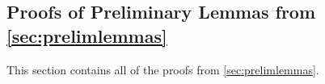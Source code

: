 \documentclass[10pt]{article}
\newcommand{\0}{{\mathbf{0}}}
\newcommand{\1}{{\mathbf{1}}}
\newcommand{\U}{{\mathbf{U}}}
\renewcommand{\t}{^{\top}}
\newcommand{\uhat}{\mathbf{\hat{U}}}
\newtheorem{corollary}{Corollary}
\newcommand{\inv}{^{-1}}
\renewcommand{\hat}{\widehat}
\renewcommand{\hat}{\widehat}
\begin{document}



\subsection{Proofs of Preliminary Lemmas from \cref{sec:prelimlemmas}} \label{sec:prelimproofs}
This section contains all of the proofs from \cref{sec:prelimlemmas}.  
\end{document}
